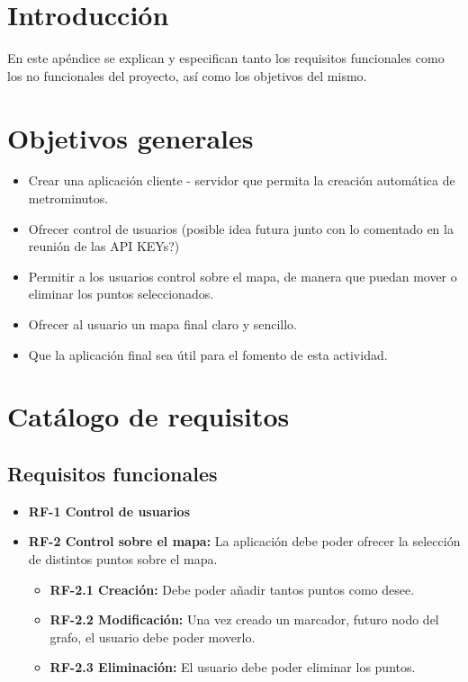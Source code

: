 
\section{Introducción}
En este apéndice se explican y especifican tanto los requisitos funcionales como los no funcionales del proyecto, así como los objetivos del mismo.

\section{Objetivos generales}

\begin{itemize}
	\item Crear una aplicación cliente - servidor que permita la creación automática de metrominutos.
    \item Ofrecer control de usuarios (posible idea futura junto con lo comentado en la reunión de las API KEYs?)
    \item Permitir a los usuarios control sobre el mapa, de manera que puedan mover o eliminar los puntos seleccionados.
    \item Ofrecer al usuario un mapa final claro y sencillo.
    \item Que la aplicación final sea útil para el fomento de esta actividad.
\end{itemize}

\section{Catálogo de requisitos}

\subsection{Requisitos funcionales}
\begin{itemize}
	\item \textbf{RF-1 Control de usuarios}
	\item \textbf{RF-2 Control sobre el mapa:} La aplicación debe poder ofrecer la selección de distintos puntos sobre el mapa.
	\begin{itemize}
		\item \textbf{RF-2.1 Creación:} Debe poder añadir tantos puntos como desee.
		\item \textbf{RF-2.2 Modificación:} Una vez creado un marcador, futuro nodo del grafo, el usuario debe poder moverlo.
		\item \textbf{RF-2.3 Eliminación:} El usuario debe poder eliminar los puntos.
	\end{itemize}
\end{itemize}


